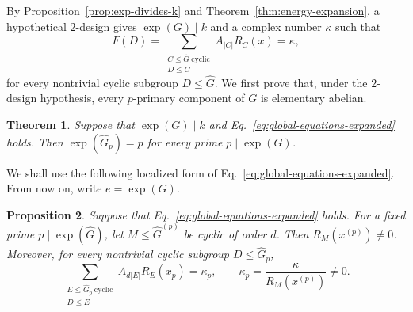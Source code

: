 \documentclass[11pt]{article}
\newtheorem{theorem}{Theorem}[section]
\newtheorem{proposition}[theorem]{Proposition}
\theoremstyle{definition}
\begin{document}
By Proposition~\ref{prop:exp-divides-k} and Theorem~\ref{thm:energy-expansion}, a hypothetical $2$-design gives $\exp(G)\mid k$ and a complex number $\kappa$ such that
\begin{equation}\label{eq:global-equations-expanded}
F(D)=\sum_{\substack{C\le \widehat G\ \mathrm{cyclic}\\D\le C}}
A_{|C|}R_C(x)
=\kappa,
\end{equation}
for every nontrivial cyclic subgroup \(D\le\widehat G\). We first prove that, under the $2$-design hypothesis, every $p$-primary component of $G$ is elementary abelian.

\begin{theorem}\label{thm:prime-local-obstruction}
	Suppose that $\exp(G)\mid k$ and Eq.~\eqref{eq:global-equations-expanded} holds.  Then
	\(\exp(\widehat G_p)=p\) for every prime \(p\mid \exp(G)\).
\end{theorem}



We shall use the following localized form of Eq.~\eqref{eq:global-equations-expanded}. From now on, write $e=\exp(G)$.


\begin{proposition}\label{prop:sylow-localization}
	Suppose that Eq.~\eqref{eq:global-equations-expanded} holds. For a fixed prime $p\mid\exp(\widehat G)$, let \(M\le\widehat G^{(p)}\) be cyclic of order \(d\). Then \(R_M(x^{(p)})\ne 0\). Moreover, for every nontrivial cyclic subgroup \(D\le\widehat G_p\),
	\begin{equation}\label{eq:local-equations}
	\sum_{\substack{E\le \widehat G_p\ \mathrm{cyclic}\\D\le E}}
	A_{d|E|}R_E(x_p)
	=
	\kappa_p,
	\qquad
	\kappa_p=\frac{\kappa}{R_M(x^{(p)})}\ne 0.
	\end{equation}
\end{proposition}
\end{document}
